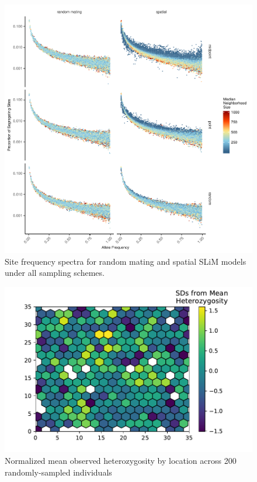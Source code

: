 \documentclass[10pt,twoside,lineno]{gsajnl}
\begin{document}
\afterpage{\clearpage}
\begin{figure}[p]
\centering
\includegraphics[width=\textwidth]{figures/fig_S1_sfs_grid_model_by_sampling.pdf}
\caption{Site frequency spectra for random mating and spatial SLiM models under all sampling schemes.}
\label{fig:allsfs}
\end{figure}

\afterpage{\clearpage}
\begin{figure}[p]
\centering
\includegraphics[]{figures/het_z_by_ind.pdf}
\caption{Normalized mean observed heterozygosity by location across 200 randomly-sampled individuals}
\label{fig:hetmap}
\end{figure}
\end{document}
